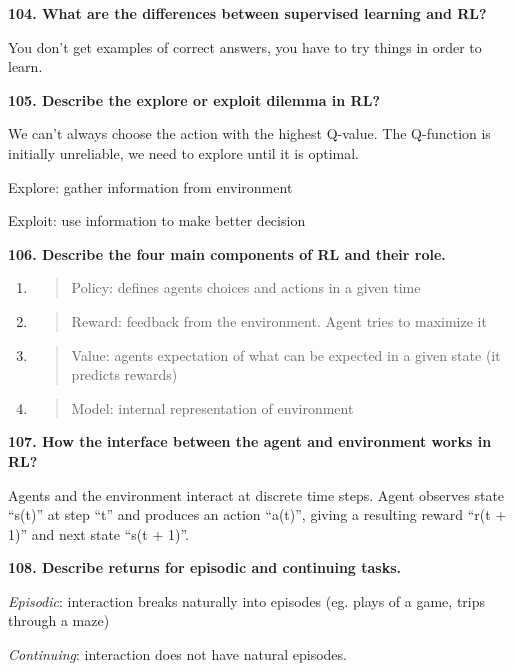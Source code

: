 \textbf{104. What are the differences between supervised learning and
RL?}

You don't get examples of correct answers, you have to try things in
order to learn.

\textbf{105. Describe the explore or exploit dilemma in RL?}

We can't always choose the action with the highest Q-value. The
Q-function is initially unreliable, we need to explore until it is
optimal.

Explore: gather information from environment

Exploit: use information to make better decision

\textbf{106. Describe the four main components of RL and their role.}

\begin{enumerate}
\def\labelenumi{\arabic{enumi}.}
\item
  \begin{quote}
  Policy: defines agents choices and actions in a given time
  \end{quote}
\item
  \begin{quote}
  Reward: feedback from the environment. Agent tries to maximize it
  \end{quote}
\item
  \begin{quote}
  Value: agents expectation of what can be expected in a given state (it
  predicts rewards)
  \end{quote}
\item
  \begin{quote}
  Model: internal representation of environment
  \end{quote}
\end{enumerate}

\textbf{107. How the interface between the agent and environment works
in RL?}

Agents and the environment interact at discrete time steps. Agent
observes state ``s(t)'' at step ``t'' and produces an action ``a(t)'',
giving a resulting reward ``r(t + 1)'' and next state ``s(t + 1)''.

\textbf{108. Describe returns for episodic and continuing tasks.}

\textit{Episodic}: interaction breaks naturally into episodes (eg.
plays of a game, trips through a maze)

\textit{Continuing}: interaction does not have natural episodes.

